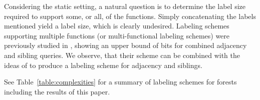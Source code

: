 \documentclass{llncs}
\newcommand{\sd}[1]{{#1}}
\newcommand{\drop}[1]{}
\begin{document}
Considering the static setting, a natural question is to determine the label
size required to support some, or all, of the functions. Simply concatenating
the labels mentioned yield a  label size, which is clearly
undesired. Labeling schemes supporting multiple functions (or multi-functional
labeling schemes) were previously studied in \cite{Alstrup05}, showing an upper
bound of  bits for combined adjacency and sibling
queries. \sd{We observe, that their scheme can be combined with the ideas of
\cite{Alstrup02} to produce a  labeling scheme for
adjacency and siblings.}
\drop{We show that most labeling schemes can be altered to also support
connectivity queries by adding an extra  bits.
 Thm.~\ref{thm:static-combo-lb} shows that such a labeling scheme requires at
 least  bits -- even if it supports just connectivity
 and sibling/ancestry queries.}

See Table~\ref{table:complexities} for a summary of labeling schemes for
forests including the results of this paper.
\end{document}
